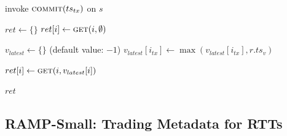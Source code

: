 \begin{algorithm}[t!]
\begin{algorithmic}[1]
  \label{rapl-begincommit-client}
  \State invoke $\textsc{commit}(ts_{tx})$ on $s$\label{rapl-commit-client}
  \EndParFor\label{rapl-endcommit-client}
\EndProcedure\vspace{.5em}\label{rapl-putall-end}

\label{rapl-client-getall-start}
  \State $ret \gets \{\}$\label{rapl-client-firstround-start}
  \State $ret[i] \gets \textsc{get}(i, \emptyset)$\label{rapl-client-firstround-get}
  \EndParFor\vspace{.25em}\label{rapl-client-firstround-end}

  \State $v_{latest} \gets \{\}$ (default value: $-1$)\label{rapl-client-latest-start}
  \State $v_{latest}[i_{tx}] \gets \max(v_{latest}[i_{tx}], r.ts_v)$\label{rapl-client-latest-calculate}
  \EndFor
  \EndFor\vspace{.25em}\label{rapl-client-latest-end}

  \label{rapl-client-secondround-start}
  \label{rapl-client-secondround-check}
  \State $ret[i] \gets \textsc{get}(i, v_{latest}[i])$\label{rapl-client-secondround-get}
  \EndIf
  \EndParFor\vspace{.25em}\label{rapl-client-secondround-end}

  \State \Return $ret$\label{rapl-client-getall-return}
\EndProcedure\label{rapl-client-getall-end}


\end{algorithmic}
\end{algorithm}


\subsection{RAMP-Small: Trading Metadata for RTTs}
\label{sec:raps}

